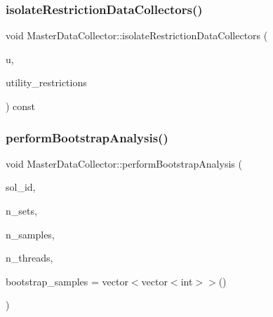 \mbox{\label{classMasterDataCollector_a640eed0cb3e00679463601adbdd3d1e6}} 
\subsubsection{\texorpdfstring{isolate\+Restriction\+Data\+Collectors()}{isolateRestrictionDataCollectors()}}
{\footnotesize\ttfamily void Master\+Data\+Collector\+::isolate\+Restriction\+Data\+Collectors (\begin{DoxyParamCaption}\item[{vector$<$ \mbox{\hyperlink{classUtilitiesDataCollector}{Utilities\+Data\+Collector}} $\ast$$>$ \&}]{u,  }\item[{vector$<$ \mbox{\hyperlink{classRestrictionsDataCollector}{Restrictions\+Data\+Collector}} $\ast$$>$ \&}]{utility\+\_\+restrictions }\end{DoxyParamCaption}) const}

\mbox{\label{classMasterDataCollector_acbf0e8a8f30e483e504d756883d45cf0}} 
\subsubsection{\texorpdfstring{perform\+Bootstrap\+Analysis()}{performBootstrapAnalysis()}}
{\footnotesize\ttfamily void Master\+Data\+Collector\+::perform\+Bootstrap\+Analysis (\begin{DoxyParamCaption}\item[{int}]{sol\+\_\+id,  }\item[{int}]{n\+\_\+sets,  }\item[{int}]{n\+\_\+samples,  }\item[{int}]{n\+\_\+threads,  }\item[{vector$<$ vector$<$ int $>$$>$}]{bootstrap\+\_\+samples = {\ttfamily vector$<$vector$<$int$>$$>$()} }\end{DoxyParamCaption})}

